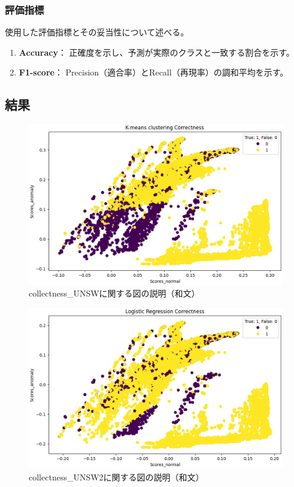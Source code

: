 \documentclass{css}
\begin{document}
\subsubsection{評価指標}
使用した評価指標とその妥当性について述べる。
\begin{enumerate}
    \item \textbf{Accuracy}：
        正確度を示し、予測が実際のクラスと一致する割合を示す。
    \item \textbf{F1-score}：
        Precision（適合率）とRecall（再現率）の調和平均を示す。
\end{enumerate}

\subsection{結果}



\begin{figure}[tb]
    \centering
    \includegraphics[width=\linewidth]{pictures/eps/collectness_UNSW.eps}
    \caption{collectness\_UNSWに関する図の説明（和文）}
    \label{fig:collectness_UNSW}
\end{figure}

\begin{figure}[tb]
    \centering
    \includegraphics[width=\linewidth]{pictures/eps/collectness_UNSW2.eps}
    \caption{collectness\_UNSW2に関する図の説明（和文）}
    \label{fig:collectness_UNSW2}
\end{figure}
\end{document}
